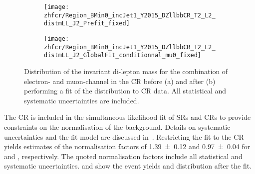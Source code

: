 
\begin{figure}[htbp]
  \centering

  \begin{subfigure}{.485\textwidth}
    \texttt{[image: zhfcr/Region\_BMin0\_incJet1\_Y2015\_DZllbbCR\_T2\_L2\_distmLL\_J2\_Prefit\_fixed]}
    \label{fig:zcr_mll_prefit}
  \end{subfigure}\hfill%
  \begin{subfigure}{.485\textwidth}
    \texttt{[image: zhfcr/Region\_BMin0\_incJet1\_Y2015\_DZllbbCR\_T2\_L2\_distmLL\_J2\_GlobalFit\_conditionnal\_mu0\_fixed]}
    \label{fig:zcr_mll_postfit}
  \end{subfigure}

  \caption[Distribution of the invariant di-lepton mass in the \ZHF~CR]{
    Distribution of the invariant di-lepton mass for the combination of
    electron- and muon-channel in the \ZHF CR before (a) and after (b)
    performing a fit of the \mll distribution to CR data. All statistical and
    systematic uncertainties are included.}

\end{figure}

The \ZHF CR is included in the simultaneous likelihood fit of SRs and CRs to
provide constraints on the normalisation of the \ZHF background. Details on
systematic uncertainties and the fit model are discussed
in~. Restricting the fit to the
CR yields estimates of the normalisation factors of \num{1.39 \pm 0.12} and
\num{0.97 \pm 0.04} for \ZHF and \ttbar, respectively. The quoted normalisation
factors include all statistical and systematic
uncertainties.  and  show the
event yields and \mll distribution after the fit.

